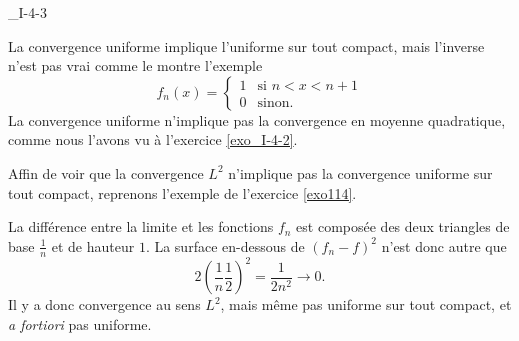 

\begin{corrige}{_I-4-3}

La convergence uniforme implique l'uniforme sur tout compact, mais l'inverse n'est pas vrai comme le montre l'exemple
\begin{equation}
	f_n(x)=\begin{cases}
	1	&	\text{si $n<x<n+1$}\\
	0	&	 \text{sinon.}
\end{cases}
\end{equation}
La convergence uniforme n'implique pas la convergence en moyenne quadratique, comme nous l'avons vu à l'exercice \ref{exo_I-4-2}.

Affin de voir que la convergence $L^2$ n'implique pas la convergence uniforme sur tout compact, reprenons l'exemple de l'exercice \ref{exo114}.



La différence entre la limite et les fonctions $f_n$ est composée des deux triangles de base $\frac{1}{ n }$ et de hauteur $1$. La surface en-dessous de $(f_n-f)^2$ n'est donc autre que
\begin{equation}
	2\left( \frac{1}{ n }\frac{1}{ 2 } \right)^2=\frac{1}{ 2n^2 }\to 0.
\end{equation}
Il y a donc convergence au sens $L^2$, mais même pas uniforme sur tout compact, et \emph{a fortiori} pas uniforme.

\end{corrige}

